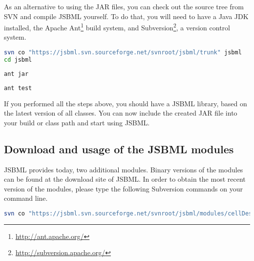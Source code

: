 As an alternative to using the JAR files, you can check out the source tree from
SVN and compile JSBML yourself. To do that, you will need to have a Java
JDK installed, the Apache
Ant\footnote{\url{http://ant.apache.org/}\label{fn:ant}} build system, and
Subversion\footnote{\url{http://subversion.apache.org/}\label{fn:svn}}, a
version control system.

\begin{lstlisting}[language=bash,numbers=none,captionpos=t,
title={Use the following command to download the latest JSBML classes (requires
Subversion\footref{fn:svn}):}]
svn co "https://jsbml.svn.sourceforge.net/svnroot/jsbml/trunk" jsbml
cd jsbml
\end{lstlisting}

\begin{lstlisting}[language=bash,numbers=none,captionpos=t,
title={To compile the JSBML library to a single JAR file, type the following
command (requires Apache Ant\footref{fn:ant}):}]
ant jar
\end{lstlisting}

\begin{lstlisting}[language=bash,numbers=none,captionpos=t,
title={If you want to run the JUnit\footref{fn:junit} tests
on your compiled JAR file, please use the following command:}]
ant test
\end{lstlisting}

If you performed all the steps above, you should have a JSBML library, based on
the latest version of all classes. You can now include the created JAR file into
your build or class path and start using JSBML.

\subsection{Download and usage of the JSBML modules}

JSBML provides today, two additional modules. Binary versions of the modules can
be found at the download site of JSBML. In order to obtain the most recent
version of the modules, please type the following Subversion
commands on your command line.

\begin{lstlisting}[language=bash,numbers=none,captionpos=t,
title={The CellDesigner bridge module should help CellDesigner plugin developers
to use JSBML as internal data structure.}]
svn co "https://jsbml.svn.sourceforge.net/svnroot/jsbml/modules/cellDesigner" cellDesigner
\end{lstlisting}

